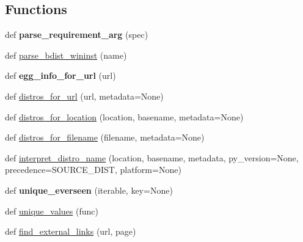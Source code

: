\subsection*{Functions}
\begin{DoxyCompactItemize}
\item 
\mbox{\label{namespacesetuptools_1_1package__index_a98c52186d6974db3f16873072bae738b}} 
def {\bfseries parse\+\_\+requirement\+\_\+arg} (spec)
\item 
def \hyperlink{namespacesetuptools_1_1package__index_a1deaaf84d6a8d1999a621f201f9df971}{parse\+\_\+bdist\+\_\+wininst} (name)
\item 
\mbox{\label{namespacesetuptools_1_1package__index_a111aa9958fee647ee3d81cb2e936c247}} 
def {\bfseries egg\+\_\+info\+\_\+for\+\_\+url} (url)
\item 
def \hyperlink{namespacesetuptools_1_1package__index_a571267e6a96f3718ea07480e2e289897}{distros\+\_\+for\+\_\+url} (url, metadata=None)
\item 
def \hyperlink{namespacesetuptools_1_1package__index_ad1cc6291d57604a866381df28930408a}{distros\+\_\+for\+\_\+location} (location, basename, metadata=None)
\item 
def \hyperlink{namespacesetuptools_1_1package__index_a2038c36ec69098c4da6c0fce1550f080}{distros\+\_\+for\+\_\+filename} (filename, metadata=None)
\item 
def \hyperlink{namespacesetuptools_1_1package__index_a1efdd05a9931992ea9882621aba5d104}{interpret\+\_\+distro\+\_\+name} (location, basename, metadata, py\+\_\+version=None, precedence=S\+O\+U\+R\+C\+E\+\_\+\+D\+I\+ST, platform=None)
\item 
\mbox{\label{namespacesetuptools_1_1package__index_a72c856e4a2c9a3925b627dc486276ed4}} 
def {\bfseries unique\+\_\+everseen} (iterable, key=None)
\item 
def \hyperlink{namespacesetuptools_1_1package__index_af5a53fb83bee4d01a3dd7e1668bccda6}{unique\+\_\+values} (func)
\item 
def \hyperlink{namespacesetuptools_1_1package__index_ae5750b097bef78b2cccd0a65c32b293e}{find\+\_\+external\+\_\+links} (url, page)
\item 
\mbox{\label{namespacesetuptools_1_1package__index_a6bc8e55badca04ff77ea91d2bd7786bc}} 

\end{DoxyCompactItemize}
